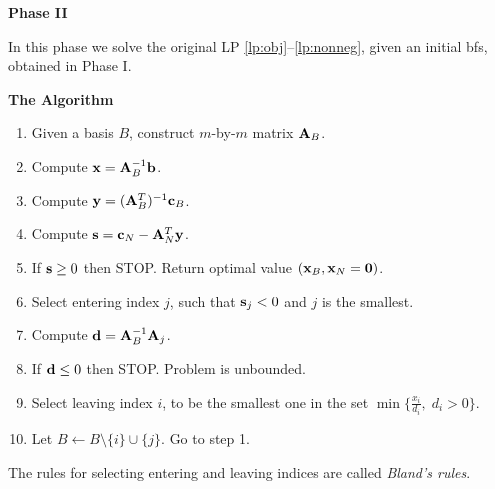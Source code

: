 \documentclass[10pt]{article}
\begin{document}
\medskip
{\bf Phase II}

In this phase we solve the original LP \eqref{lp:obj}--\eqref{lp:nonneg}, given an initial bfs, obtained in Phase I.

\medskip
{\bf The Algorithm}
\begin{enumerate}
    \item Given a basis $B$, construct $m$-by-$m$ matrix ${\bf A}_B$.
    \item Compute ${\bf x} = {\bf A}_B^{-1} {\bf b}$.
    \item Compute ${\bf y} = ({\bf A}_B^T)^{-1} {\bf c}_B$.
    \item Compute ${\bf s} = {\bf c}_N - {\bf A}_N^T {\bf y}$.
    \item If ${\bf s} \geq 0$ then STOP. Return optimal value $({\bf x}_B, {\bf x}_N = {\bf 0})$.
    \item Select entering index $j$, such that ${\bf s}_j < 0$ and $j$ is the smallest.
    \item Compute ${\bf d} = {\bf A}_B^{-1} {\bf A}_j$. 
    \item If ${\bf d} \leq 0$ then STOP. Problem is unbounded.
    \item Select leaving index $i$, to be the smallest one in the set $\min \{ \frac{x_i}{d_i}, \; d_i > 0 \}$.
    \item Let $B \leftarrow B \setminus \{ i \} \cup \{ j \}$. Go to step 1.
\end{enumerate}

The rules for selecting entering and leaving indices are called {\em Bland's rules}.
\end{document}
